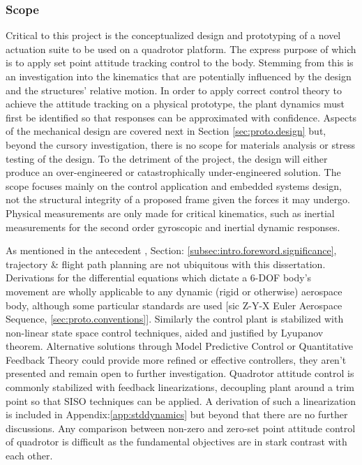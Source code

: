 \subsubsection{Scope}
\label{subsubsec:intro.foreword.scope}
Critical to this project is the conceptualized design and prototyping of a novel actuation suite to be used on a quadrotor platform. The express purpose of which is to apply set point attitude tracking control to the body. Stemming from this is an investigation into the kinematics that are potentially influenced by the design and the structures' relative motion. In order to apply correct control theory to achieve the attitude tracking on a physical prototype, the plant dynamics must first be identified so that responses can be approximated with confidence. Aspects of the mechanical design are covered next in Section \ref{sec:proto.design} but, beyond the cursory investigation, there is no scope for materials analysis or stress testing of the design. To the detriment of the project, the design will either produce an over-engineered or catastrophically under-engineered solution. The scope focuses mainly on the control application and embedded systems design, not the structural integrity of a proposed frame given the forces it may undergo. Physical measurements are only made for critical kinematics, such as inertial measurements for the second order gyroscopic and inertial dynamic responses.
\par
As mentioned in the antecedent , Section: \ref{subsec:intro.foreword.significance}, trajectory \& flight path planning are not ubiquitous with this dissertation. Derivations for the differential equations which dictate a 6-DOF body's movement are wholly applicable to any dynamic (rigid or otherwise) aerospace body, although some particular standards are used [sic Z-Y-X Euler Aerospace Sequence, \ref{sec:proto.conventions}]. Similarly the control plant is stabilized with non-linear state space control techniques, aided and justified by Lyupanov theorem. Alternative solutions through Model Predictive Control or Quantitative Feedback Theory could provide more refined or effective controllers, they aren't presented and remain open to further investigation. Quadrotor attitude control is commonly stabilized with feedback linearizations, decoupling plant around a trim point so that SISO techniques can be applied. A derivation of such a linearization is included in Appendix:\ref{app:stddynamics} but beyond that there are no further discussions. Any comparison between non-zero and zero-set point attitude control of quadrotor is difficult as the fundamental objectives are in stark contrast with each other.
